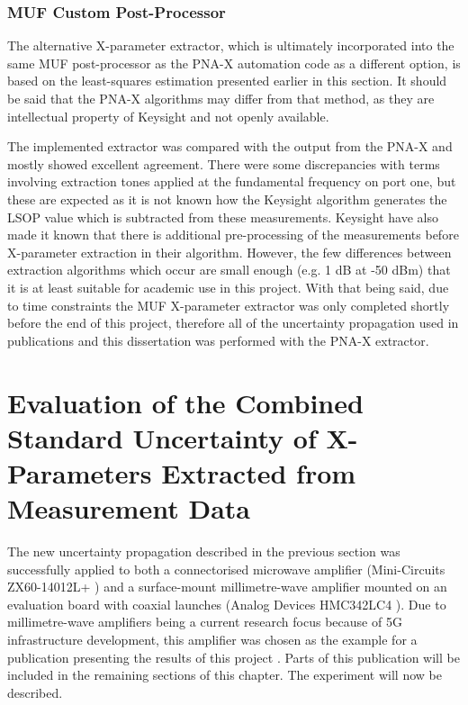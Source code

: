 \documentclass[../thesis/thesis.tex]{subfiles}
\begin{document}
\begin{refsection}
\subsubsection{MUF Custom Post-Processor}

The alternative X-parameter extractor, which is ultimately incorporated into the same MUF post-processor as the PNA-X automation code as a different option, is based on the least-squares estimation presented earlier in this section. It should be said that the PNA-X algorithms may differ from that method, as they are intellectual property of Keysight and not openly available.

The implemented extractor was compared with the output from the PNA-X and mostly showed excellent agreement. There were some discrepancies with terms involving extraction tones applied at the fundamental frequency on port one, but these are expected as it is not known how the Keysight algorithm generates the LSOP value which is subtracted from these measurements. Keysight have also made it known that there is additional pre-processing of the measurements before X-parameter extraction in their algorithm. However, the few differences between extraction algorithms which occur are small enough (e.g. 1 dB at -50 dBm) that it is at least suitable for academic use in this project. With that being said, due to time constraints the MUF X-parameter extractor was only completed shortly before the end of this project, therefore all of the uncertainty propagation used in publications and this dissertation was performed with the PNA-X extractor.

\section{Evaluation of the Combined Standard Uncertainty of X-Parameters Extracted from Measurement Data}

The new uncertainty propagation described in the previous section was successfully applied to both a connectorised microwave amplifier (Mini-Circuits ZX60-14012L+ \cite{minicircuits}) and a surface-mount millimetre-wave amplifier mounted on an evaluation board with coaxial launches (Analog Devices HMC342LC4 \cite{hittite_amp}). Due to millimetre-wave amplifiers being a current research focus because of 5G infrastructure development, this amplifier was chosen as the example for a publication presenting the results of this project \cite{Stant_2018_TMTT}. Parts of this publication will be included in the remaining sections of this chapter. The experiment will now be described.


\end{refsection}
\end{document}

